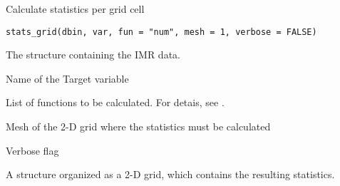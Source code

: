 %
\begin{Description}\relax
Calculate statistics per grid cell
\end{Description}
%
\begin{Usage}
\begin{verbatim}
stats_grid(dbin, var, fun = "num", mesh = 1, verbose = FALSE)
\end{verbatim}
\end{Usage}
%
\begin{Arguments}
\begin{ldescription}
\item[\code{dbin}] 
The  structure containing the IMR data.

\item[\code{var}] 
Name of the Target variable

\item[\code{fun}] 
List of functions to be calculated. For detais, see .

\item[\code{mesh}] 
Mesh of the 2-D grid where the statistics must be calculated

\item[\code{verbose}] 
Verbose flag

\end{ldescription}
\end{Arguments}
%
\begin{Value}
A  structure organized as a 2-D grid, which contains
the resulting statistics.
\end{Value}
